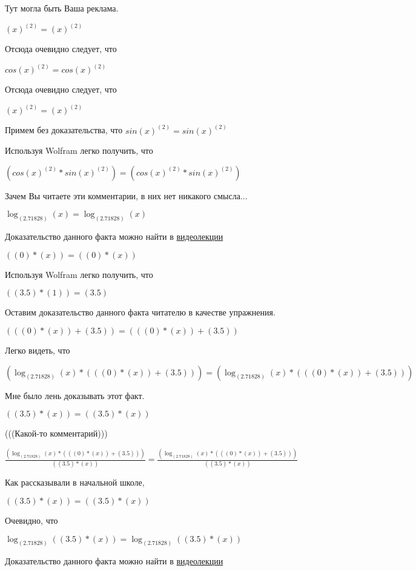 \documentclass[12pt,a4paper,fleqn]{article}
\theoremstyle{definition}
\begin{document}
Тут могла быть Ваша реклама.

${( x )}^{( 2 )} = {( x )}^{( 2 )}$

Отсюда очевидно следует, что

$cos{( x )}^{( 2 )} = cos{( x )}^{( 2 )}$

Отсюда очевидно следует, что

${( x )}^{( 2 )} = {( x )}^{( 2 )}$

Примем без доказательства, что
$sin{( x )}^{( 2 )} = sin{( x )}^{( 2 )}$

Используя Wolfram легко получить, что

$(cos{( x )}^{( 2 )} * sin{( x )}^{( 2 )}) = (cos{( x )}^{( 2 )} * sin{( x )}^{( 2 )})$

Зачем Вы читаете эти комментарии, в них нет никакого смысла...

$\log_{( 2.71828 )}{( x )} = \log_{( 2.71828 )}{( x )}$

Доказательство данного факта можно найти в \href{https://www.youtube.com/watch?v=dQw4w9WgXcQ}{видеолекции}

$(( 0 ) * ( x )) = (( 0 ) * ( x ))$

Используя Wolfram легко получить, что

$(( 3.5 ) * ( 1 )) = ( 3.5 )$

Оставим доказательство данного факта читателю в качестве упражнения.

$((( 0 ) * ( x )) + ( 3.5 )) = ((( 0 ) * ( x )) + ( 3.5 ))$

Легко видеть, что

$(\log_{( 2.71828 )}{( x )} * ((( 0 ) * ( x )) + ( 3.5 ))) = (\log_{( 2.71828 )}{( x )} * ((( 0 ) * ( x )) + ( 3.5 )))$

Мне было лень доказывать этот факт.

$(( 3.5 ) * ( x )) = (( 3.5 ) * ( x ))$

(((Какой-то комментарий)))

$\frac{(\log_{( 2.71828 )}{( x )} * ((( 0 ) * ( x )) + ( 3.5 )))}{(( 3.5 ) * ( x ))}
 = \frac{(\log_{( 2.71828 )}{( x )} * ((( 0 ) * ( x )) + ( 3.5 )))}{(( 3.5 ) * ( x ))}
$

Как рассказывали в начальной школе,

$(( 3.5 ) * ( x )) = (( 3.5 ) * ( x ))$

Очевидно, что

$\log_{( 2.71828 )}{(( 3.5 ) * ( x ))} = \log_{( 2.71828 )}{(( 3.5 ) * ( x ))}$

Доказательство данного факта можно найти в \href{https://www.youtube.com/watch?v=dQw4w9WgXcQ}{видеолекции}
\end{document}
